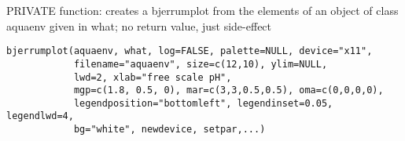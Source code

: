 \documentclass{article}
\begin{document}
\begin{Description}\relax
PRIVATE function: creates a bjerrumplot from the elements of an object of class aquaenv given in what; no return value, just side-effect
\end{Description}
\begin{Usage}
\begin{verbatim}bjerrumplot(aquaenv, what, log=FALSE, palette=NULL, device="x11",
            filename="aquaenv", size=c(12,10), ylim=NULL,
            lwd=2, xlab="free scale pH",
            mgp=c(1.8, 0.5, 0), mar=c(3,3,0.5,0.5), oma=c(0,0,0,0),
            legendposition="bottomleft", legendinset=0.05, legendlwd=4,
            bg="white", newdevice, setpar,...)\end{verbatim}
\end{Usage}
\end{document}

